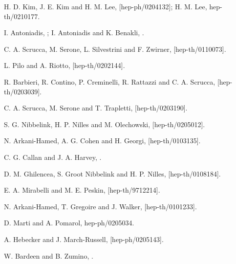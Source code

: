 \documentclass[a4paper,12pt]{article}
\begin{document}
\begin{thebibliography}{99}
H. D. Kim, J. E. Kim and H. M. Lee, [hep-ph/0204132];
H. M. Lee, hep-th/0210177. 

 I. Antoniadis, ;
I. Antoniadis and K. Benakli, .

C. A. Scrucca, M. Serone, L. Silvestrini and F. Zwirner, 
[hep-th/0110073].

L. Pilo and A. Riotto, [hep-th/0202144].

R. Barbieri, R. Contino, P. Creminelli, R. Rattazzi and C. A. Scrucca,
[hep-th/0203039].

C. A. Scrucca, M. Serone and T. Trapletti,  
[hep-th/0203190].

S. G. Nibbelink, H. P. Nilles and M. Olechowski,  
[hep-th/0205012]. 

 N. Arkani-Hamed, A. G. Cohen and H. Georgi,
[hep-th/0103135].

C. G. Callan and J. A. Harvey, .

 D. M. Ghilencea, S. Groot Nibbelink and H. P. Nilles,
[hep-th/0108184].

E. A. Mirabelli and M. E. Peskin,  [hep-th/9712214].

N. Arkani-Hamed, T. Gregoire and J. Walker,  
[hep-th/0101233]. 

D. Marti and A. Pomarol, hep-ph/0205034.

A. Hebecker and J. March-Russell, 
[hep-ph/0205143].

 W. Bardeen and B. Zumino, .

\end{thebibliography}
\end{document}
